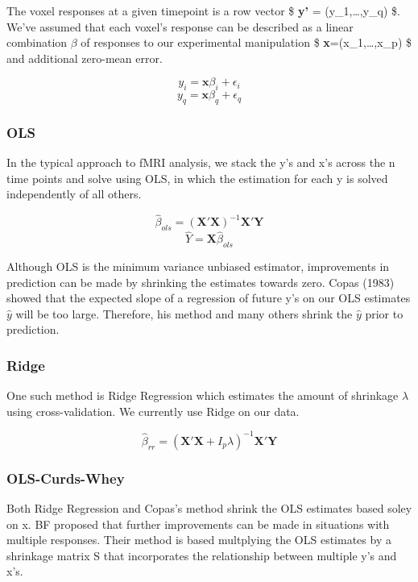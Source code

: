 \documentclass{article}
\begin{document}
The voxel responses at a given timepoint is a row vector \$ \textbf{y'}
= (y\_1,\ldots{},y\_q) \$. We've assumed that each voxel's response can
be described as a linear combination $ \beta $ of responses to our
experimental manipulation \$ \textbf{x}=(x\_1,\ldots{},x\_p) \$ and
additional zero-mean error.

\[ y_i = \textbf{x} \beta_i + \epsilon_i \]
\[ y_q = \textbf{x} \beta_q + \epsilon_q \]

\subsubsection{OLS}\label{ols}

In the typical approach to fMRI analysis, we stack the y's and x's
across the n time points and solve using OLS, in which the estimation
for each y is solved independently of all others.

\[ \hat \beta_{ols} =  (\textbf{X}'\textbf{X})^{-1} \textbf{X}' \textbf{Y} \]
\[ \hat Y = \textbf{X} \hat \beta_{ols} \]

Although OLS is the minimum variance unbiased estimator, improvements in
prediction can be made by shrinking the estimates towards zero. Copas
(1983) showed that the expected slope of a regression of future y's on
our OLS estimates $ \hat y $ will be too large. Therefore, his method
and many others shrink the $ \hat y $ prior to prediction.

\subsubsection{Ridge}\label{ridge}

One such method is Ridge Regression which estimates the amount of
shrinkage $ \lambda $ using cross-validation. We currently use Ridge
on our data.

\[ \hat \beta_{rr} =  (\textbf{X}'\textbf{X} + I_p \lambda )^{-1} \textbf{X}' \textbf{Y} \]

\subsubsection{OLS-Curds-Whey}\label{ols-curds-whey}

Both Ridge Regression and Copas's method shrink the OLS estimates based
soley on x. BF proposed that further improvements can be made in
situations with multiple responses. Their method is based multplying the
OLS estimates by a shrinkage matrix S that incorporates the relationship
between multiple y's and x's.
\end{document}
